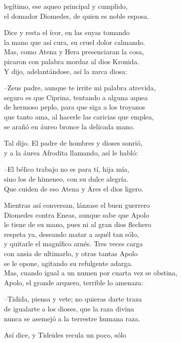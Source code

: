 \documentclass[11pt,twoside]{article}
\begin{document}
legítimo, ese aqueo principal y cumplido,\\
el domador Diomedes, de quien es noble esposa.\par
Dice y resta el ícor, en las suyas tomando\\
la mano que así cura, su cruel dolor calmando.\\
Mas, como Atena y Hera presenciaran la cosa,\\
picaron con palabra mordaz al dios Kronida.\\
Y dijo, adelantándose, así la zarca diosa:\par
--Zeus padre, aunque te irrite mi palabra atrevida,\\
seguro es que Ciprina, tentando a alguna aquea\\
de hermoso peplo, para que siga a los troyanos\\
que tanto ama, al hacerle las caricias que emplea,\\
se arañó en áureo bronce la delicada mano.\par
Tal dijo. El padre de hombres y dioses sonrió,\\
y a la áurea Afrodita llamando, así le habló:\par
--El bélico trabajo no es para tí, hija mía,\\
sino los de himeneo, con su dulce alegría.\\
Que cuiden de eso Atena y Ares el dios ligero.\par
Mientras así conversan, lánzase el buen guerrero\\
Diomedes contra Eneas, aunque sabe que Apolo\\
le tiene de su mano, pues ni al gran dios flechero\\
respeta ya, deseando matar a aquél tan sólo,\\
y quitarle el magnífico arnés. Tres veces carga\\
con ansia de ultimarlo, y otras tantas Apolo\\
se le opone, agitando su refulgente adarga.\\
Mas, cuando igual a un numen por cuarta vez se obstina,\\
Apolo, el grande arquero, terrible lo amenaza:\par
--Tidida, piensa y vete; no quieras darte traza\\
de igualarte a los dioses, que la raza divina\\
nunca se asemejó a la terrestre humana raza.\par
Así dice, y Tideides recula un poco, sólo\\
\end{document}
